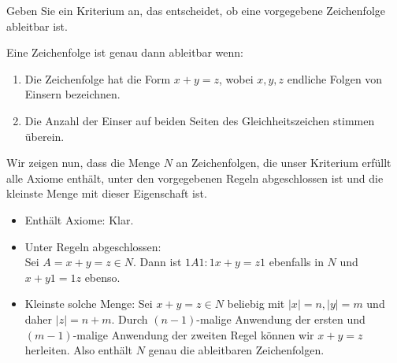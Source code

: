 
\begin{exercise}[54]

Geben Sie ein Kriterium an, das entscheidet, ob eine vorgegebene Zeichenfolge ableitbar ist.

\end{exercise}


\begin{solution}
Eine Zeichenfolge ist genau dann ableitbar wenn:
\begin{enumerate}[label = \alph*)]
  \item Die Zeichenfolge hat die Form $x + y = z$, wobei $x,y,z$
  endliche Folgen von Einsern bezeichnen.
  \item Die Anzahl der Einser auf beiden Seiten des Gleichheitszeichen stimmen überein.
\end{enumerate}

Wir zeigen nun, dass die Menge $N$ an Zeichenfolgen, die unser Kriterium erfüllt
alle Axiome enthält, unter den vorgegebenen Regeln abgeschlossen ist und
die kleinste Menge mit dieser Eigenschaft ist.

\begin{itemize}
  \item Enthält Axiome: Klar.
  \item Unter Regeln abgeschlossen: \\
  Sei $A = x + y = z \in N$. Dann ist $1A1: 1x + y = z1$ ebenfalls in $N$
  und $x + y1 = 1z$ ebenso.
  \item Kleinste solche Menge: Sei $x + y = z \in N$ beliebig mit
  $|x| = n, |y| = m$ und daher $|z| = n + m$. Durch $(n-1)$-malige
  Anwendung der ersten und $(m-1)$-malige Anwendung der zweiten Regel
  können wir $x + y = z$ herleiten. Also enthält $N$ genau die
  ableitbaren Zeichenfolgen.
\end{itemize}
\end{solution}

